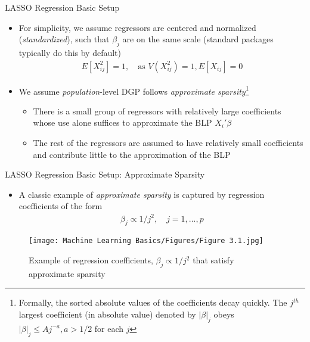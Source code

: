 \documentclass[aspectratio=1610,12pt,xcolor=dvipsnames]{beamer}
\begin{document}
\begin{frame}{LASSO Regression Basic Setup}
    \begin{itemize}
        \item For simplicity, we assume regressors are centered and normalized (\textit{standardized}), such that $\beta_j$ are on the same scale (standard packages typically do this by default)
    \begin{align*}
        E[X_{ij}^2] = 1, \quad \text{as } V(X_{ij}^2)=1, E[X_{ij}]=0
    \end{align*}
        \item We assume \textit{population}-level DGP follows \textit{approximate sparsity}\footnote{Formally, the sorted absolute values of the coefficients decay quickly. The $j^{th}$ largest coefficient (in absolute value) denoted by $|\beta|_j$ obeys $|\beta|_j \leq Aj^{-a}, a >1/2$ for each $j$}
        \begin{itemize}
            \item There is a small group of regressors with relatively large coefficients whose use alone suffices to approximate the BLP $X_i'\beta$
            \item The rest of the regressors are assumed to have relatively small coefficients and contribute little to the approximation of the BLP
        \end{itemize}
    \end{itemize}
\end{frame}

\begin{frame}{LASSO Regression Basic Setup: Approximate Sparsity}
\begin{itemize}
    \item A classic example of \textit{approximate sparsity} is captured by regression coefficients of the form
    \begin{align*}
        \beta_j \propto 1/j^2, \quad j = 1,...,p
    \end{align*}
\end{itemize}
    \begin{figure}
        \centering
        \texttt{[image: Machine Learning Basics/Figures/Figure 3.1.jpg]}
        \caption{Example of regression coefficients, $\beta_j \propto 1/j^2$ that satisfy approximate sparsity}
        \label{fig:figure3.1}
    \end{figure}
\end{frame}
\end{document}
